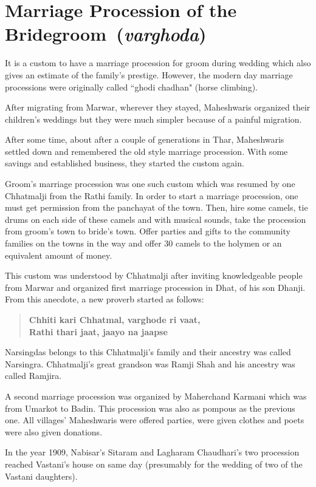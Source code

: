\chapter{Marriage Procession of the Bridegroom~(\textit{varghoda})}
It is a custom to have a marriage procession for groom during wedding which
also gives an estimate of the family's prestige. However, the modern day
marriage processions were originally called ``ghodi chadhan" (horse climbing).

After migrating from Marwar, wherever they stayed, Maheshwaris organized their
children's weddings but they were much simpler because of a painful migration.

After some time, about after a couple of generations in Thar, Maheshwaris
settled down and remembered the old style marriage procession. With some
savings and established business, they started the custom again.

Groom's marriage procession was one such custom which was resumed by one
Chhatmalji from the Rathi family. In order to start a marriage procession, one
must get permission from the panchayat of the town. Then, hire some camels, tie
drums on each side of these camels and with musical sounds, take the procession
from groom's town to bride's town. Offer parties and gifts to the community
families on the towns in the way and offer 30 camels to the holymen or an
equivalent amount of money.

This custom was understood by Chhatmalji after inviting knowledgeable people
from Marwar and organized first marriage procession in Dhat, of his son Dhanji.
From this anecdote, a new proverb started as follows:

\begin{quote}
\textbf{Chhiti kari Chhatmal, varghode ri vaat,\\
Rathi thari jaat, jaayo na jaapse}
\end{quote}

Narsingdas belongs to this Chhatmalji's family and their ancestry was called
Narsingra. Chhatmalji's great grandson was Ramji Shah and his ancestry was
called Ramjira.

A second marriage procession was organized by Maherchand Karmani which was from
Umarkot to Badin. This procession was also as pompous as the previous one. All
villages' Maheshwaris were offered parties, were given clothes and poets were
also given donations.

In the year 1909, Nabisar's Sitaram and Lagharam Chaudhari's two procession
reached Vastani's house on same day (presumably for the wedding of two of the
Vastani daughters).

